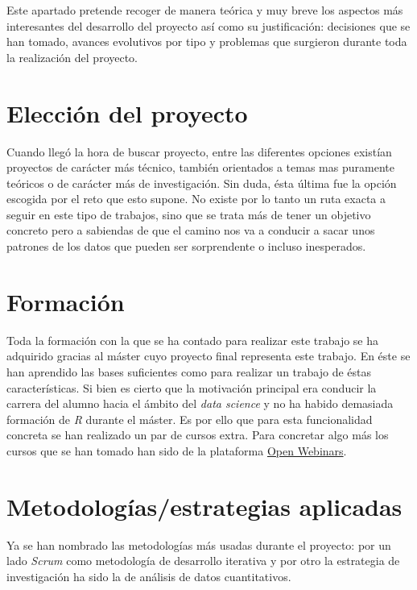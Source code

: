 
Este apartado pretende recoger de manera teórica y muy breve los aspectos más interesantes del desarrollo del proyecto así como su justificación: decisiones que se han tomado, avances evolutivos por tipo y problemas que surgieron durante toda la realización del proyecto.


\section{Elección del proyecto}\label{inicio-proyecto}
Cuando llegó la hora de buscar proyecto, entre las diferentes opciones existían proyectos de carácter más técnico, también orientados a temas mas puramente teóricos o de carácter más de investigación. Sin duda, ésta última fue la opción escogida por el reto que esto supone. No existe por lo tanto un ruta exacta a seguir en este tipo de trabajos, sino que se trata más de tener un objetivo concreto pero a sabiendas de que el camino nos va a conducir a sacar unos patrones de los datos que pueden ser sorprendente o incluso inesperados. 

\section{Formación}\label{formacion}

Toda la formación con la que se ha contado para realizar este trabajo se ha adquirido gracias al máster cuyo proyecto final representa este trabajo. En éste se han aprendido las bases suficientes como para realizar un trabajo de éstas características. Si bien es cierto que la motivación principal era conducir la carrera del alumno hacia el ámbito del \textit{data science} y no ha habido demasiada formación de \textit{R} durante el máster. Es por ello que para esta funcionalidad concreta se han realizado un par de cursos extra. Para concretar algo más los cursos que se han tomado han sido de la plataforma \href{https://openwebinars.net/}{Open Webinars}.

\section{Metodologías/estrategias aplicadas}\label{metodologia}

Ya se han nombrado las metodologías más usadas durante el proyecto: por un lado \textit{Scrum} como metodología de desarrollo iterativa y por otro la estrategia de investigación ha sido la de análisis de datos cuantitativos. 

